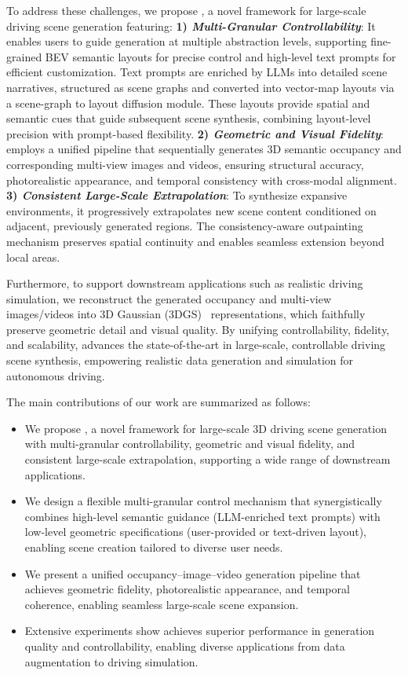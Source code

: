 To address these challenges, we propose \textbf{\method}, a novel framework for large-scale driving scene generation featuring:
\textbf{1) \emph{Multi-Granular Controllability}}: It enables users to guide generation at multiple abstraction levels, supporting fine-grained BEV semantic layouts for precise control and high-level text prompts for efficient customization. Text prompts are enriched by LLMs into detailed scene narratives, structured as scene graphs and converted into vector-map layouts via a scene-graph to layout diffusion module. These layouts provide spatial and semantic cues that guide subsequent scene synthesis, combining layout-level precision with prompt-based flexibility.
\textbf{2) \emph{Geometric and Visual Fidelity}}: {\method} employs a unified pipeline that sequentially generates 3D semantic occupancy and corresponding multi-view images and videos, ensuring structural accuracy, photorealistic appearance, and temporal consistency with cross-modal alignment.
\textbf{3) \emph{Consistent Large-Scale Extrapolation}}: To synthesize expansive environments, it progressively extrapolates new scene content conditioned on adjacent, previously generated regions. The consistency-aware outpainting mechanism preserves spatial continuity and enables seamless extension beyond local areas.

Furthermore, to support downstream applications such as realistic driving simulation, we reconstruct the generated occupancy and multi-view images/videos into 3D Gaussian (3DGS)~\cite{3DGS} representations, which faithfully preserve geometric detail and visual quality. By unifying controllability, fidelity, and scalability, {\method} advances the state-of-the-art in large-scale, controllable driving scene synthesis, empowering realistic data generation and simulation for autonomous driving.

The main contributions of our work are summarized as follows:
\vspace{-2mm}
\begin{itemize}[align=right,itemindent=0em,labelsep=2pt,labelwidth=1em,leftmargin=*,itemsep=0em] 
\item We propose {\method}, a novel framework for large-scale 3D driving scene generation with multi-granular controllability, geometric and visual fidelity, and consistent large-scale extrapolation, supporting a wide range of downstream applications.
\item  We design a flexible multi-granular control mechanism that synergistically combines high-level semantic guidance (LLM-enriched text prompts) with low-level geometric specifications (user-provided or text-driven layout), enabling scene creation tailored to diverse user needs.
\item We present a unified occupancy–image–video generation pipeline that achieves geometric fidelity, photorealistic appearance, and temporal coherence, enabling seamless large-scale scene expansion.
\item Extensive experiments show {\method} achieves superior performance in generation quality and controllability, enabling diverse applications from data augmentation to driving simulation.
\end{itemize}